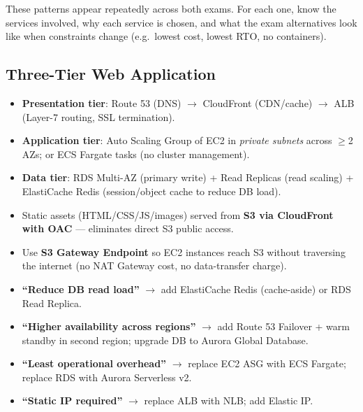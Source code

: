 

These patterns appear repeatedly across both exams. For each one, know the
services involved, why each service is chosen, and what the exam alternatives
look like when constraints change (e.g.\ lowest cost, lowest RTO, no containers).

\subsection{Three-Tier Web Application}

\begin{keyfacts}
\begin{itemize}
  \item \textbf{Presentation tier}: Route 53 (DNS) $\to$ CloudFront (CDN/cache) $\to$ ALB
        (Layer-7 routing, SSL termination).
  \item \textbf{Application tier}: Auto Scaling Group of EC2 in \emph{private subnets}
        across $\geq$2 AZs; or ECS Fargate tasks (no cluster management).
  \item \textbf{Data tier}: RDS Multi-AZ (primary write) + Read Replicas (read scaling) +
        ElastiCache Redis (session/object cache to reduce DB load).
  \item Static assets (HTML/CSS/JS/images) served from \textbf{S3 via CloudFront with OAC}
        — eliminates direct S3 public access.
  \item Use \textbf{S3 Gateway Endpoint} so EC2 instances reach S3 without traversing the
        internet (no NAT Gateway cost, no data-transfer charge).
\end{itemize}
\end{keyfacts}

\begin{examtip}[title={[!] When the question changes the constraint}]
\begin{itemize}
  \item \textbf{``Reduce DB read load''} $\to$ add ElastiCache Redis (cache-aside) or
        RDS Read Replica.
  \item \textbf{``Higher availability across regions''} $\to$ add Route 53 Failover + warm
        standby in second region; upgrade DB to Aurora Global Database.
  \item \textbf{``Least operational overhead''} $\to$ replace EC2 ASG with ECS Fargate;
        replace RDS with Aurora Serverless v2.
  \item \textbf{``Static IP required''} $\to$ replace ALB with NLB; add Elastic IP.
\end{itemize}
\end{examtip}

